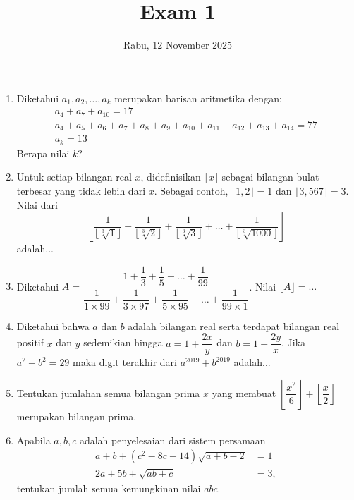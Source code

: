 \documentclass[12pt]{scrartcl}
\title{Exam 1}
\date{Rabu, 12 November 2025}
\begin{document}
\maketitle

\renewcommand*\contentsname{Daftar Isi}
\tableofcontents

\newpage
\begin{enumerate}
    \item Diketahui $a_1, a_2, \dots, a_k$ merupakan barisan aritmetika dengan:
    \begin{align*}
        a_4 + a_7 + a_{10} = 17\\
    a_4 + a_5 + a_6 + a_7 + a_8 + a_9 + a_{10} + a_{11} + a_{12} + a_{13} + a_{14} = 77\\
    a_k = 13
    \end{align*}
    Berapa nilai $k$?

    \item Untuk setiap bilangan real $x$, didefinisikan $\lfloor x \rfloor$ sebagai bilangan bulat terbesar yang tidak lebih dari $x$. Sebagai contoh, $\lfloor 1,2 \rfloor = 1$ dan $\lfloor 3,567 \rfloor = 3$. Nilai dari
    \[ \left\lfloor \dfrac{1}{\lfloor \sqrt[3]{1} \rfloor} + \dfrac{1}{\lfloor \sqrt[3]{2} \rfloor} + \dfrac{1}{\lfloor \sqrt[3]{3} \rfloor} + \dots + \dfrac{1}{\lfloor \sqrt[3]{1000} \rfloor} \right\rfloor \]
    adalah...

    \item Diketahui $A = \dfrac{1+\dfrac{1}{3}+\dfrac{1}{5}+\dots+\dfrac{1}{99}}{\dfrac{1}{1\times99}+\dfrac{1}{3\times97}+\dfrac{1}{5\times95}+\dots+\dfrac{1}{99\times1}}$. Nilai $\lfloor A \rfloor =\dots$
    
    \item Diketahui bahwa $a$ dan $b$ adalah bilangan real serta terdapat bilangan real positif $x$ dan $y$ sedemikian hingga $a=1+\dfrac{2x}{y}$ dan $b=1+\dfrac{2y}{x}$. Jika $a^2+b^2=29$ maka digit terakhir dari $a^{2019}+b^{2019}$ adalah...

    \item Tentukan jumlahan semua bilangan prima $x$ yang membuat $\left\lfloor \dfrac{x^2}{6} \right\rfloor + \left\lfloor \dfrac{x}{2} \right\rfloor$ merupakan bilangan prima.

    \item Apabila $a,b,c$ adalah penyelesaian dari sistem persamaan
    \begin{align*}
        a+b+(c^2-8c+14)\sqrt{a+b-2} &= 1\\
        2a+5b+\sqrt{ab+c} &= 3,
    \end{align*}
    tentukan jumlah semua kemungkinan nilai $abc$.


\end{enumerate}
\end{document}
